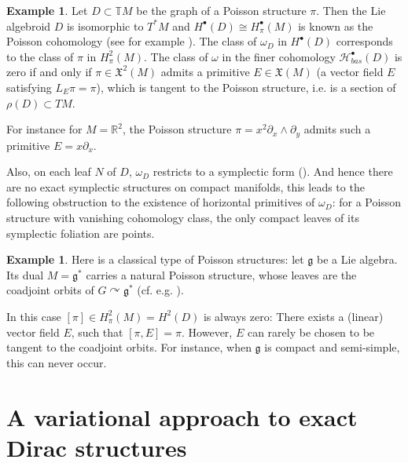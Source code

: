 \documentclass[a4paper,12pt]{amsart}
\theoremstyle{definition}
\newtheorem{Lemma}[Definition]{Lemma}
\newtheorem{Example}[Definition]{Example}
\newcommand{\leaf}[0]{{N}}
\begin{document}
\begin{Example}
Let $D\subset \mathbb TM$ be the graph of a Poisson structure $\pi$. Then the Lie algebroid $D$ is isomorphic to $T^*M$ and $H^\bullet(D)\cong H^\bullet_{\pi}(M)$ is known as the Poisson cohomology {(see for example \cite{dSw})}. The class of $\omega_D$ in $H^\bullet(D)$ corresponds to the class of $\pi$ in $H^2_{\pi}(M)$. The class of $\omega$ in the finer cohomology $\mathcal H_{bas}^\bullet(D)$ is zero if and only if $\pi\in \mathfrak X^2(M)$ admits a primitive $E\in \mathfrak X(M)$ {(a vector field $E$ satisfying $L_E \pi = \pi$)}, which is tangent to the Poisson structure,
i.e. is a section of $\rho(D)\subset TM$. 

For instance for $M=\mathbb R^2$, the Poisson structure $\pi=x^2\partial_x\wedge \partial_y$ admits such a primitive $E=x\partial_x$. 




Also, on each leaf $\leaf$ of $D$, $\omega_D$ restricts to a symplectic form (\cite{burs}). { And hence there are no exact symplectic structures on compact manifolds, this leads to the following obstruction to the existence of horizontal primitives of $\omega_D$: 
for a Poisson structure with  vanishing cohomology class, the only compact leaves of its symplectic foliation are points. }

\end{Example}

\begin{Example}
{Here is a classical type of Poisson structures:}
let $\mathfrak g$ be a Lie algebra. Its dual $M=\mathfrak g^*$ carries a natural Poisson structure, whose leaves are the coadjoint orbits of $G\curvearrowright\mathfrak g^*$ (cf. e.g. \cite{zbMATH06054532}). 

In this case $[\pi]\in H^2_\pi(M)=H^2(D)$ is always zero: There exists a (linear) vector field $E$, such that $[\pi,E]=\pi$. However, $E$ can rarely be chosen to be tangent to the coadjoint orbits. For instance, when $\mathfrak g$ is compact and semi-simple, this can never occur.



\end{Example}





\section{A variational approach to exact Dirac structures}
\end{document}
